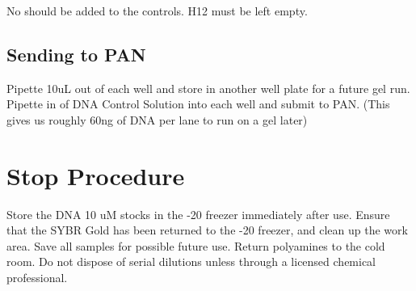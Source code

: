 \documentclass{ssiBio}
\begin{document}
No \tdt{} should be added to the controls. H12 must be left empty.

\subsection{Sending to PAN}

Pipette 10uL out of each well and store in another well plate for a future gel run. Pipette in  of DNA Control Solution into each well and submit to PAN. (This gives us roughly 60ng of DNA per lane to run on a gel later)

\section{Stop Procedure}
Store the DNA 10 uM stocks in the -20 freezer immediately after use. Ensure that the SYBR Gold has been returned to the -20 freezer, and clean up the work area. Save all samples for possible future use.
Return polyamines to the cold room. Do not dispose of serial dilutions unless through a licensed chemical professional.

\begin{comment}
\subsection{Analysis}

\begin{figure}[ht]
\centering
\texttt{[image: ./gels/Gel\_1.png]}
\label{}
\caption{Gel 1}
\end{figure}



\end{comment}
\end{document}
